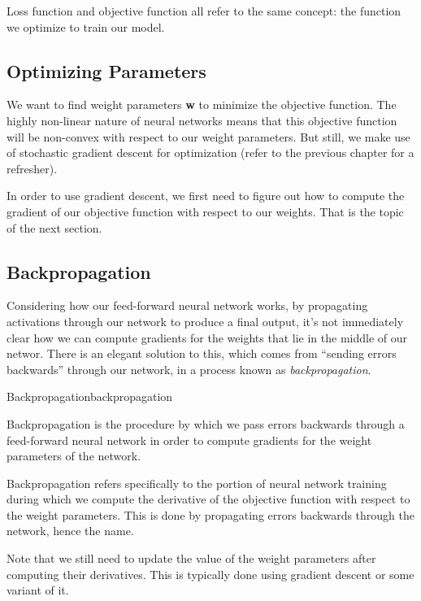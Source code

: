 \begin{warning}
    Loss function and  objective function all refer to the same concept: the function we optimize to train our model.
\end{warning}

\subsection{Optimizing Parameters}

We want to find weight parameters \textbf{w} to minimize the objective function. The highly non-linear nature of neural networks means that this objective function will be non-convex with respect to our weight parameters. But still, we make use of stochastic gradient descent for optimization (refer to the previous chapter for a refresher).

In order to use gradient descent, we first need to figure out how to compute the gradient of our objective function with respect to our weights. That is the topic of the next section.

\subsection{Backpropagation}

Considering how our feed-forward neural network works, by propagating activations through our network to produce a final output, it's not immediately clear how we can compute gradients for the weights that lie in the middle of our networ. There is an elegant solution to this, which comes from ``sending errors backwards'' through our network, in a process known as \textit{backpropagation}.

\begin{definition}{Backpropagation}{backpropagation}
  
Backpropagation is the procedure by which we pass errors backwards through a feed-forward neural network in order to compute gradients for the weight parameters of the network.
\end{definition}

Backpropagation refers specifically to the portion of neural network training during which we compute the derivative of the objective function with respect to the weight parameters. This is done by propagating errors backwards through the network, hence the name.

\begin{warning}
    Note that we still need to update the value of the weight parameters after computing their derivatives. This is typically done using gradient descent or some variant of it.
\end{warning}

